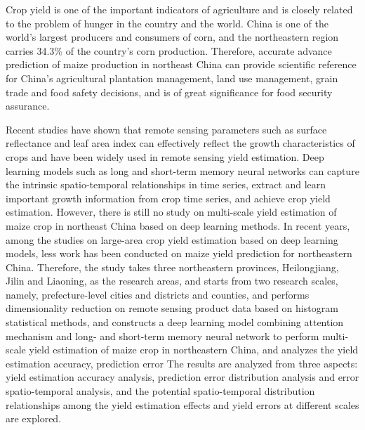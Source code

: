 \par Crop yield is one of the important indicators of agriculture and is closely related to the problem of hunger in the country and the world. China is one of the world's largest producers and consumers of corn, and the northeastern region carries 34.3\% of the country's corn production. Therefore, accurate advance prediction of maize production in northeast China can provide scientific reference for China's agricultural plantation management, land use management, grain trade and food safety decisions, and is of great significance for food security assurance.

\par Recent studies have shown that remote sensing parameters such as surface reflectance and leaf area index can effectively reflect the growth characteristics of crops and have been widely used in remote sensing yield estimation. Deep learning models such as long and short-term memory neural networks can capture the intrinsic spatio-temporal relationships in time series, extract and learn important growth information from crop time series, and achieve crop yield estimation. However, there is still no study on multi-scale yield estimation of maize crop in northeast China based on deep learning methods. In recent years, among the studies on large-area crop yield estimation based on deep learning models, less work has been conducted on maize yield prediction for northeastern China. Therefore, the study takes three northeastern provinces, Heilongjiang, Jilin and Liaoning, as the research areas, and starts from two research scales, namely, prefecture-level cities and districts and counties, and performs dimensionality reduction on remote sensing product data based on histogram statistical methods, and constructs a deep learning model combining attention mechanism and long- and short-term memory neural network to perform multi-scale yield estimation of maize crop in northeastern China, and analyzes the yield estimation accuracy, prediction error The results are analyzed from three aspects: yield estimation accuracy analysis, prediction error distribution analysis and error spatio-temporal analysis, and the potential spatio-temporal distribution relationships among the yield estimation effects and yield errors at different scales are explored.

